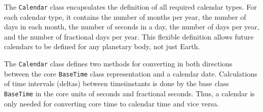 
The {\tt Calendar} class encapsulates the definition of all required
calendar types. For each calendar type, it contains the number of months
per year, the number of days in each month, the number of seconds in a day,
the number of days per year, and the number of fractional days per year.
This flexible definition allows future calendars to be defined for any
planetary body, not just Earth.

The {\tt Calendar} class defines two methods for converting in both
directions between the core {\tt BaseTime} class representation and a
calendar date.  Calculations of time intervals (deltas) between
timeiinstants is done by the base class {\tt BaseTime} in the core units
of seconds and fractional seconds.  Thus,  a calendar is only needed for
converting core time to calendar time and vice versa.

